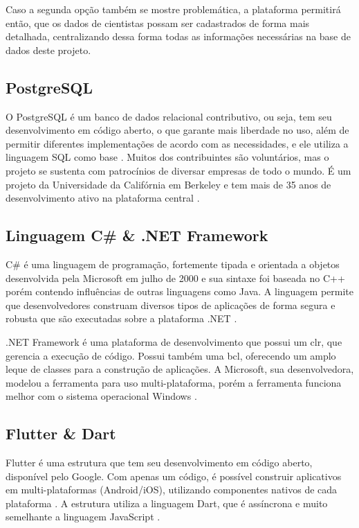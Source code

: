 Caso a segunda opção também se mostre problemática, a plataforma permitirá então, que os dados de cientistas possam ser cadastrados de forma mais detalhada, centralizando dessa forma todas as informações necessárias na base de dados deste projeto.

\subsection{PostgreSQL}\label{subsec:postgresql}

O PostgreSQL é um banco de dados relacional contributivo, ou seja, tem seu desenvolvimento em código aberto, o que garante mais liberdade no uso, além de permitir diferentes implementações de acordo com as necessidades, e ele utiliza a linguagem SQL como base \cite{Amazon}. Muitos dos contribuintes são voluntários, mas o projeto se sustenta com patrocínios de diversar empresas de todo o mundo. É um projeto da Universidade da Califórnia em Berkeley e tem mais de 35 anos de desenvolvimento ativo na plataforma central \cite{PostgreSQL}.

\subsection{Linguagem C{\#} {\&} .NET Framework}\label{subsec:csharp}

C{\#} é uma linguagem de programação, fortemente tipada e orientada a objetos desenvolvida pela Microsoft em julho de 2000 e sua sintaxe foi baseada no C++ porém contendo influências de outras linguagens como Java. A linguagem permite que desenvolvedores construam diversos tipos de aplicações de forma segura e robusta que são executadas sobre a plataforma .NET \cite{CSharp}.

.NET Framework é uma plataforma de desenvolvimento que possui um \gls{clr}, que gerencia a execução de código. Possui também uma \gls{bcl}, oferecendo um amplo leque de classes para a construção de aplicações. A Microsoft, sua desenvolvedora, modelou a ferramenta para uso multi-plataforma, porém a ferramenta funciona melhor com o sistema operacional Windows \cite{CSharpDevelopment}.

\subsection{Flutter {\&} Dart}\label{subsec:flutterdart}

Flutter é uma estrutura que tem seu desenvolvimento em código aberto, disponível pelo Google. Com apenas um código, é possível construir aplicativos em multi-plataformas (Android/iOS), utilizando componentes nativos de cada plataforma \cite{Flutter}. A estrutura utiliza a linguagem Dart, que é assíncrona e muito semelhante a linguagem JavaScript \cite{Dart}.

